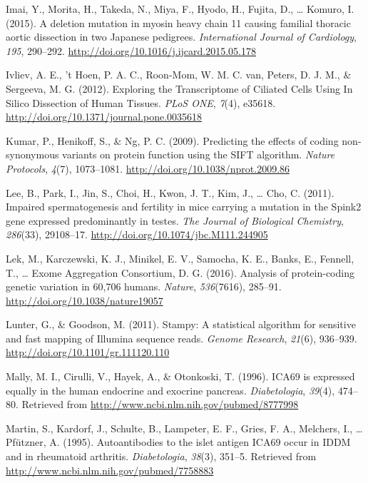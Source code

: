 \documentclass[12pt,twoside]{reedthesis}
\theoremstyle{definition}
\theoremstyle{definition}
\theoremstyle{remark}
\begin{document}
  \hypertarget{ref-Imai2015}{}
  Imai, Y., Morita, H., Takeda, N., Miya, F., Hyodo, H., Fujita, D.,
  \ldots{} Komuro, I. (2015). A deletion mutation in myosin heavy chain 11
  causing familial thoracic aortic dissection in two Japanese pedigrees.
  \emph{International Journal of Cardiology}, \emph{195}, 290--292.
  \url{http://doi.org/10.1016/j.ijcard.2015.05.178}
  
  \hypertarget{ref-Ivliev2012}{}
  Ivliev, A. E., 't Hoen, P. A. C., Roon-Mom, W. M. C. van, Peters, D. J.
  M., \& Sergeeva, M. G. (2012). Exploring the Transcriptome of Ciliated
  Cells Using In Silico Dissection of Human Tissues. \emph{PLoS ONE},
  \emph{7}(4), e35618. \url{http://doi.org/10.1371/journal.pone.0035618}
  
  \hypertarget{ref-Kumar2009}{}
  Kumar, P., Henikoff, S., \& Ng, P. C. (2009). Predicting the effects of
  coding non-synonymous variants on protein function using the SIFT
  algorithm. \emph{Nature Protocols}, \emph{4}(7), 1073--1081.
  \url{http://doi.org/10.1038/nprot.2009.86}
  
  \hypertarget{ref-Lee2011}{}
  Lee, B., Park, I., Jin, S., Choi, H., Kwon, J. T., Kim, J., \ldots{}
  Cho, C. (2011). Impaired spermatogenesis and fertility in mice carrying
  a mutation in the Spink2 gene expressed predominantly in testes.
  \emph{The Journal of Biological Chemistry}, \emph{286}(33), 29108--17.
  \url{http://doi.org/10.1074/jbc.M111.244905}
  
  \hypertarget{ref-Lek2016}{}
  Lek, M., Karczewski, K. J., Minikel, E. V., Samocha, K. E., Banks, E.,
  Fennell, T., \ldots{} Exome Aggregation Consortium, D. G. (2016).
  Analysis of protein-coding genetic variation in 60,706 humans.
  \emph{Nature}, \emph{536}(7616), 285--91.
  \url{http://doi.org/10.1038/nature19057}
  
  \hypertarget{ref-Lunter2011}{}
  Lunter, G., \& Goodson, M. (2011). Stampy: A statistical algorithm for
  sensitive and fast mapping of Illumina sequence reads. \emph{Genome
  Research}, \emph{21}(6), 936--939.
  \url{http://doi.org/10.1101/gr.111120.110}
  
  \hypertarget{ref-Mally1996}{}
  Mally, M. I., Cirulli, V., Hayek, A., \& Otonkoski, T. (1996). ICA69 is
  expressed equally in the human endocrine and exocrine pancreas.
  \emph{Diabetologia}, \emph{39}(4), 474--80. Retrieved from
  \url{http://www.ncbi.nlm.nih.gov/pubmed/8777998}
  
  \hypertarget{ref-Martin1995}{}
  Martin, S., Kardorf, J., Schulte, B., Lampeter, E. F., Gries, F. A.,
  Melchers, I., \ldots{} Pfützner, A. (1995). Autoantibodies to the islet
  antigen ICA69 occur in IDDM and in rheumatoid arthritis.
  \emph{Diabetologia}, \emph{38}(3), 351--5. Retrieved from
  \url{http://www.ncbi.nlm.nih.gov/pubmed/7758883}
  
\end{document}
